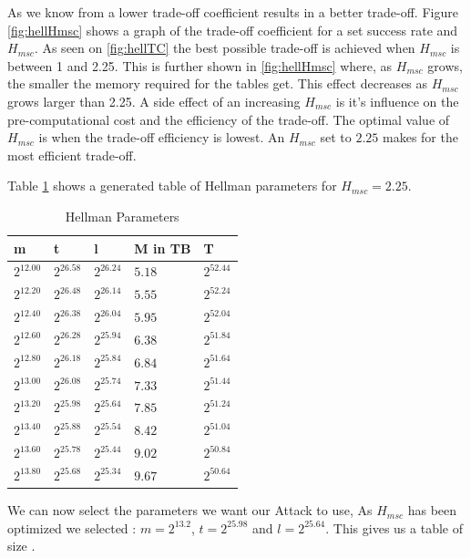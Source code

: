 As we know from \cite{176} a lower trade-off coefficient results in a
better trade-off. Figure \ref{fig:hellHmsc} shows a graph of the
trade-off coefficient for a set success rate and $H_{msc}$.
As seen on \ref{fig:hellTC} the best possible trade-off is achieved
when $H_{msc}$ is between 1 and 2.25. This is further shown in
\ref{fig:hellHmsc} where, as $H_{msc}$ grows, the smaller the memory
required for the tables get. This effect decreases as $H_{msc}$ grows
larger than 2.25. A side effect of an increasing $H_{msc}$ is it's
influence on the pre-computational cost and the efficiency of the
trade-off. The optimal value of $H_{msc}$ is when the trade-off
efficiency is lowest. An $H_{msc}$ set to $2.25$ makes for the most
efficient trade-off.

Table \ref{tab:hellparam} shows a generated table of Hellman
parameters for $H_{msc} =2.25$.
\begin{table}[H]
  \centering
\begin{tabular}{lllll}
m & t & l & M in TB & T \\\hline
$2^{12.00}$ & $2^{26.58}$ & $2^{26.24}$ & $5.18$ & $2^{52.44}$ \\
$2^{12.20}$ & $2^{26.48}$ & $2^{26.14}$ & $5.55$ & $2^{52.24}$ \\
$2^{12.40}$ & $2^{26.38}$ & $2^{26.04}$ & $5.95$ & $2^{52.04}$ \\
$2^{12.60}$ & $2^{26.28}$ & $2^{25.94}$ & $6.38$ & $2^{51.84}$ \\
$2^{12.80}$ & $2^{26.18}$ & $2^{25.84}$ & $6.84$ & $2^{51.64}$ \\
$2^{13.00}$ & $2^{26.08}$ & $2^{25.74}$ & $7.33$ & $2^{51.44}$ \\
$2^{13.20}$ & $2^{25.98}$ & $2^{25.64}$ & $7.85$ & $2^{51.24}$ \\
$2^{13.40}$ & $2^{25.88}$ & $2^{25.54}$ & $8.42$ & $2^{51.04}$ \\
$2^{13.60}$ & $2^{25.78}$ & $2^{25.44}$ & $9.02$ & $2^{50.84}$ \\
$2^{13.80}$ & $2^{25.68}$ & $2^{25.34}$ & $9.67$ & $2^{50.64}$ \\
\end{tabular}
  \caption{Hellman Parameters}
  \label{tab:hellparam}
\end{table}
We can now select the parameters we want our Attack to use, As $H_{msc}$ has been optimized we selected : $m=2^{13.2}$, $t=2^{25.98}$ and $l=2^{25.64}$.
This gives us a table of size .
